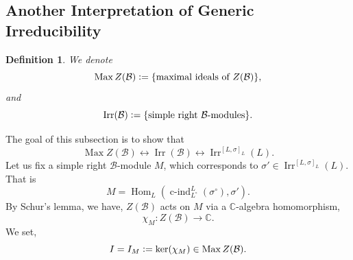\documentclass[8pt]{article}
\newtheorem{definition}{Definition}[section]
\DeclareMathOperator{\cind}{c-ind}
\DeclareMathOperator{\Hom}{Hom}
\DeclareMathOperator{\Irr}{Irr}
\DeclareMathOperator{\Max}{Max}
\newcommand{\defeq}{\vcentcolon=}
\newcommand{\C}[0]{\mathbb{C}}
\newcommand{\cB}{\mathcal{B}}
\begin{document}
\subsection{Another Interpretation of Generic Irreducibility}

\begin{definition}
  We denote
  \begin{equation*}
    \Max Z(\cB) \defeq \{\text{maximal ideals of $Z(\cB)$}\},
  \end{equation*}
  and 
  \begin{equation*}
    \Irr(\cB) \defeq \{\text{simple right $\cB$-modules}\}.
  \end{equation*}
\end{definition}

The goal of this subsection is to show that 
\begin{equation*}
  \Max Z(\cB)\leftrightarrow \Irr(\cB)\leftrightarrow \Irr^{[L,\sigma]_L}(L).
\end{equation*}
Let us fix a simple right $\cB$-module $M$, which corresponds to $\sigma'\in\Irr^{[L,\sigma]_L}(L)$. That is 
\begin{equation*}
  M = \Hom_L(\cind_{L^\circ}^L(\sigma^\circ),\sigma').
\end{equation*}
By Schur's lemma, we have, $Z(\cB)$ acts on $M$ via a $\C$-algebra homomorphism,
\begin{equation*}
  \chi_M:Z(\cB)\to \C.
\end{equation*}
We set,
\begin{equation*}
  I = I_M\defeq \ker(\chi_M)\in\Max Z(\cB).
\end{equation*}
\end{document}
